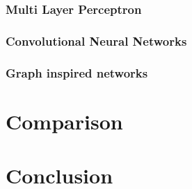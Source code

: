 \documentclass{article}
\begin{document}
\subsubsection{Multi Layer Perceptron}


\newpage %
\subsubsection{Convolutional Neural Networks}


\newpage %
\subsubsection{Graph inspired networks}



\section{Comparison}

\section{Conclusion}

  


\end{document}
